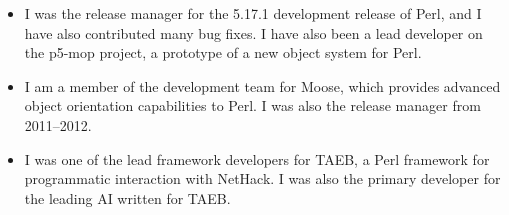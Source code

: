 \documentclass[letterpaper]{article}
\begin{document}
\begin{itemize}
    \item {} \vspace{6pt} \linebreak
        \small{I was the release manager for the 5.17.1 development release of Perl,
        and I have also contributed many bug fixes. I have also been a lead
        developer on the p5-mop project, a prototype of a new object system for
        Perl.}\normalsize
    \item {} \vspace{6pt} \linebreak
        \small{I am a member of the development team for Moose, which provides
        advanced object orientation capabilities to Perl. I was also the
        release manager from 2011--2012.}\normalsize
    \item {} \vspace{6pt} \linebreak
        \small{I was one of the lead framework developers for TAEB, a Perl framework
        for programmatic interaction with NetHack. I was also the primary
        developer for the leading AI written for TAEB.}\normalsize
\end{itemize}
\end{document}
